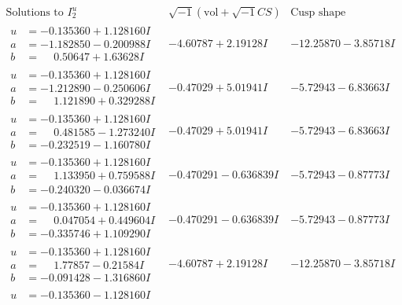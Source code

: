\documentclass[1p]{elsarticle_modified}
\theoremstyle{definition}
\newcommand{\I}{\sqrt{-1}}
\begin{document}
$$\begin{array}{c|c|c}  
\text{Solutions to }I^u_{2}& \I (\text{vol} + \sqrt{-1}CS) & \text{Cusp shape}\\
 \hline 
\begin{aligned}
u &= -0.135360 + 1.128160 I \\
a &= -1.182850 - 0.200988 I \\
b &= \phantom{-}0.50647 + 1.63628 I\end{aligned}
 & -4.60787 + 2.19128 I & -12.25870 - 3.85718 I \\ \hline\begin{aligned}
u &= -0.135360 + 1.128160 I \\
a &= -1.212890 - 0.250606 I \\
b &= \phantom{-}1.121890 + 0.329288 I\end{aligned}
 & -0.47029 + 5.01941 I & -5.72943 - 6.83663 I \\ \hline\begin{aligned}
u &= -0.135360 + 1.128160 I \\
a &= \phantom{-}0.481585 - 1.273240 I \\
b &= -0.232519 - 1.160780 I\end{aligned}
 & -0.47029 + 5.01941 I & -5.72943 - 6.83663 I \\ \hline\begin{aligned}
u &= -0.135360 + 1.128160 I \\
a &= \phantom{-}1.133950 + 0.759588 I \\
b &= -0.240320 - 0.036674 I\end{aligned}
 & -0.470291 - 0.636839 I & -5.72943 - 0.87773 I \\ \hline\begin{aligned}
u &= -0.135360 + 1.128160 I \\
a &= \phantom{-}0.047054 + 0.449604 I \\
b &= -0.335746 + 1.109290 I\end{aligned}
 & -0.470291 - 0.636839 I & -5.72943 - 0.87773 I \\ \hline\begin{aligned}
u &= -0.135360 + 1.128160 I \\
a &= \phantom{-}1.77857 - 0.21584 I \\
b &= -0.091428 - 1.316860 I\end{aligned}
 & -4.60787 + 2.19128 I & -12.25870 - 3.85718 I \\ \hline\begin{aligned}
u &= -0.135360 - 1.128160 I \\

\end{aligned}
\end{array}$$
\end{document}
